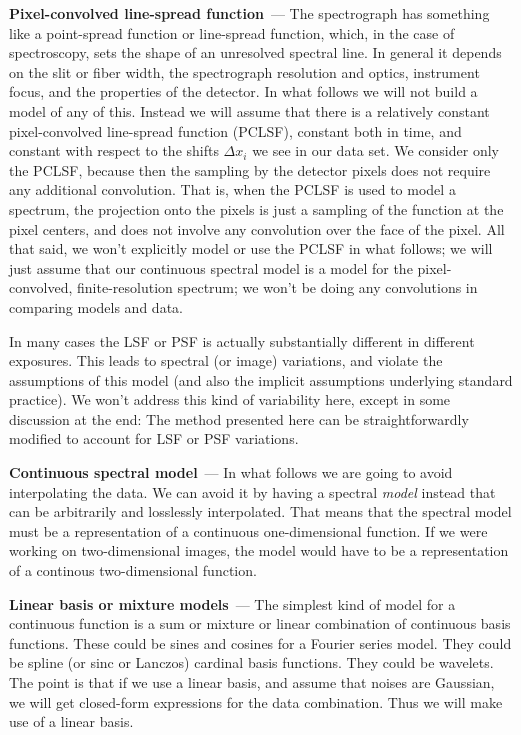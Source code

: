 \documentclass[modern]{aastex631}
\renewcommand{\paragraph}[1]{\medskip\par\noindent\textbf{#1}~---}
\begin{document}
\paragraph{Pixel-convolved line-spread function}
The spectrograph has something like a point-spread function or line-spread function, which, in the case of spectroscopy, sets the shape of an unresolved spectral line.
In general it depends on the slit or fiber width, the spectrograph resolution and optics, instrument focus, and the properties of the detector.
In what follows we will not build a model of any of this.
Instead we will assume that there is a relatively constant pixel-convolved line-spread function (PCLSF), constant both in time, and constant with respect to the shifts $\Delta x_i$ we see in our data set.
We consider only the PCLSF, because then the sampling by the detector pixels does not require any additional convolution.
That is, when the PCLSF is used to model a spectrum, the projection onto the pixels is just a sampling of the function at the pixel centers, and does not involve any convolution over the face of the pixel.
All that said, we won't explicitly model or use the PCLSF in what follows; we will just assume that our continuous spectral model is a model for the pixel-convolved, finite-resolution spectrum; we won't be doing any convolutions in comparing models and data.

In many cases the LSF or PSF is actually substantially different in different exposures.
This leads to spectral (or image) variations, and violate the assumptions of this model (and also the implicit assumptions underlying standard practice).
We won't address this kind of variability here, except in some discussion at the end:
The method presented here can be straightforwardly modified to account for LSF or PSF variations.

\paragraph{Continuous spectral model} 
In what follows we are going to avoid interpolating the data.
We can avoid it by having a spectral \emph{model} instead that can be arbitrarily and losslessly interpolated.
That means that the spectral model must be a representation of a continuous one-dimensional function.
If we were working on two-dimensional images, the model would have to be a representation of a continous two-dimensional function.

\paragraph{Linear basis or mixture models}
The simplest kind of model for a continuous function is a sum or mixture or linear combination of continuous basis functions.
These could be sines and cosines for a Fourier series model.
They could be spline (or sinc or Lanczos) cardinal basis functions.
They could be wavelets.
The point is that if we use a linear basis, and assume that noises are Gaussian, we will get closed-form expressions for the data combination.
Thus we will make use of a linear basis.
\end{document}
